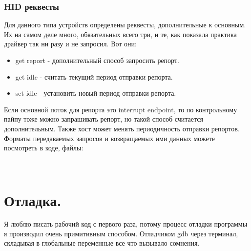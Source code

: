\documentclass[12pt,a4paper]{article}
\begin{document}
\subsubsection{HID реквесты}\label{2}
    Для данного типа устройств определены реквесты, дополнительные к основным.
    Их на самом деле много, обязательных всего три, и те, как показала практика
    драйвер так ни разу и не запросил. Вот они:
\begin{itemize}
    \item get report - дополнительный способ запросить репорт.
    \item get idle - считать текущий период отправки репорта.
    \item set idle - установить новый период отправки репорта.
\end{itemize}
    Если основной поток для репорта это interrupt endpoint, то по контрольному
    пайпу тоже можно запрашивать репорт, но такой способ считается
    дополнительным. Также хост может менять периодичность отправки репортов.
    Форматы передаваемых запросов и возвращаемых ими данных можете посмотреть
     в коде, файлы:\\
    \\
    \\

\newpage
\section{Отладка.}
    Я люблю писать рабочий код с первого раза, потому процесс отладки
    программы я производил очень примитивным способом. Отладчиком gdb через
    терминал, складывая в глобальные переменные все что вызывало сомнения.

\end{document}
